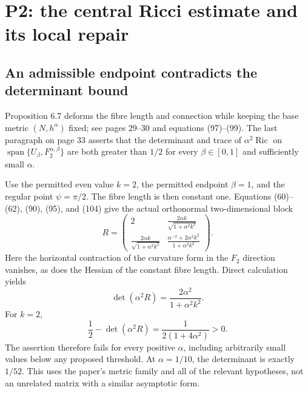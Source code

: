 \documentclass[10pt]{article}
\begin{document}
\section*{P2: the central Ricci estimate and its local repair}
\subsection*{An admissible endpoint contradicts the determinant bound}
Proposition 6.7 deforms the fibre length and connection while keeping the base metric \((N,h^\alpha)\) fixed; see pages 29–30 and equations (97)–(99). The last paragraph on page 33 asserts that the determinant and trace of \(\alpha^2\operatorname{Ric}\) on \(\operatorname{span}\{U_\beta,F_2^{\alpha,\beta}\}\) are both greater than \(1/2\) for every \(\beta\in[0,1]\) and sufficiently small \(\alpha\).\par
Use the permitted even value \(k=2\), the permitted endpoint \(\beta=1\), and the regular point \(\psi=\pi/2\). The fibre length is then constant one. Equations (60)–(62), (90), (95), and (104) give the actual orthonormal two-dimensional block \[R=\begin{pmatrix}
2 & \displaystyle\frac{2\alpha k}{\sqrt{1+\alpha^2k^2}}\\[5pt]
\displaystyle\frac{2\alpha k}{\sqrt{1+\alpha^2k^2}}&
\displaystyle\frac{\alpha^{-2}+2\alpha^2k^2}{1+\alpha^2k^2}
\end{pmatrix}.\] Here the horizontal contraction of the curvature form in the \(F_2\) direction vanishes, as does the Hessian of the constant fibre length. Direct calculation yields \[\det(\alpha^2R)=\frac{2\alpha^2}{1+\alpha^2k^2}.\] For \(k=2\), \[\frac12-\det(\alpha^2R)=\frac{1}{2(1+4\alpha^2)}>0.\] The assertion therefore fails for every positive \(\alpha\), including arbitrarily small values below any proposed threshold. At \(\alpha=1/10\), the determinant is exactly \(1/52\). This uses the paper’s metric family and all of the relevant hypotheses, not an unrelated matrix with a similar asymptotic form.\par
\end{document}
